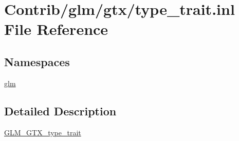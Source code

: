 \hypertarget{type__trait_8inl}{}\section{Contrib/glm/gtx/type\+\_\+trait.inl File Reference}
\label{type__trait_8inl}
\subsection*{Namespaces}
\begin{DoxyCompactItemize}
\item 
 \mbox{\hyperlink{namespaceglm}{glm}}
\end{DoxyCompactItemize}


\subsection{Detailed Description}
\mbox{\hyperlink{group__gtx__type__trait}{G\+L\+M\+\_\+\+G\+T\+X\+\_\+type\+\_\+trait}} 